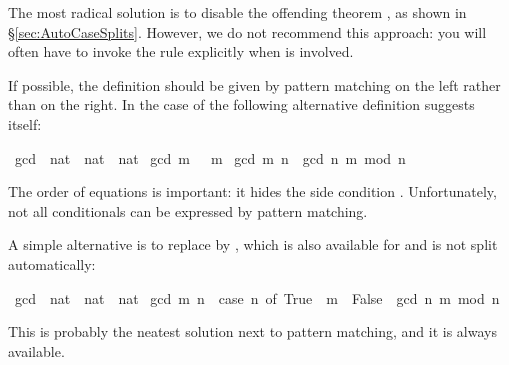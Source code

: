 \begin{isabellebody}
\begin{isamarkuptext}
The most radical solution is to disable the offending theorem
,
as shown in \S\ref{sec:AutoCaseSplits}.  However, we do not recommend this
approach: you will often have to invoke the rule explicitly when
 is involved.

If possible, the definition should be given by pattern matching on the left
rather than  on the right. In the case of  the
following alternative definition suggests itself:%
\end{isamarkuptext}%
\isamarkuptrue%
\isamarkupfalse%
\ gcd{}\ {\isacharcolon}{\isacharcolon}\ {\isachardoublequoteopen}nat\ {\isasymRightarrow}\ nat\ {\isasymRightarrow}\ nat{\isachardoublequoteclose}\ \isanewline
{\isachardoublequoteopen}gcd{}\ m\ {}\ {\isacharequal}\ m{\isachardoublequoteclose}\ {\isacharbar}\isanewline
{\isachardoublequoteopen}gcd{}\ m\ n\ {\isacharequal}\ gcd{}\ n\ {\isacharparenleft}m\ mod\ n{\isacharparenright}{\isachardoublequoteclose}%
\begin{isamarkuptext}%
\noindent
The order of equations is important: it hides the side condition
.  Unfortunately, not all conditionals can be
expressed by pattern matching.

A simple alternative is to replace  by , 
which is also available for  and is not split automatically:%
\end{isamarkuptext}%
\isamarkuptrue%
\isamarkupfalse%
\ gcd{}\ {\isacharcolon}{\isacharcolon}\ {\isachardoublequoteopen}nat\ {\isasymRightarrow}\ nat\ {\isasymRightarrow}\ nat{\isachardoublequoteclose}\ \isanewline
{\isachardoublequoteopen}gcd{}\ m\ n\ {\isacharequal}\ {\isacharparenleft}case\ n{\isacharequal}{}\ of\ True\ {\isasymRightarrow}\ m\ {\isacharbar}\ False\ {\isasymRightarrow}\ gcd{}\ n\ {\isacharparenleft}m\ mod\ n{\isacharparenright}{\isacharparenright}{\isachardoublequoteclose}%
\begin{isamarkuptext}%
\noindent
This is probably the neatest solution next to pattern matching, and it is
always available.


\end{isamarkuptext}
\end{isabellebody}
